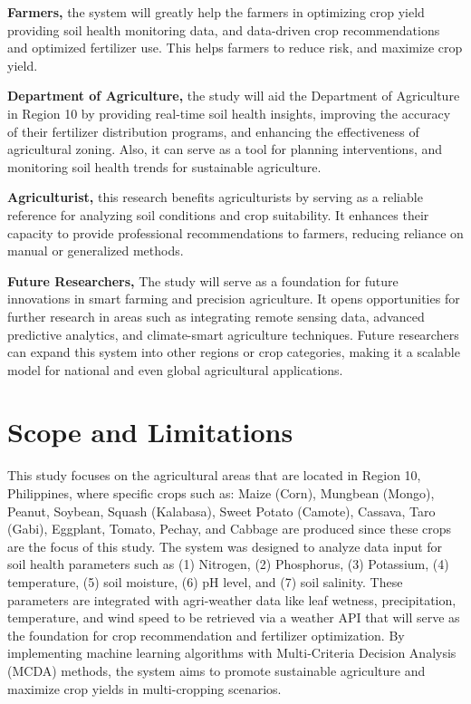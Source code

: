 \begin{doublespace}
\textbf{Farmers,} the system will greatly help the farmers in optimizing crop yield providing soil health monitoring data, and data-driven crop recommendations and optimized fertilizer use. This helps farmers to reduce risk, and maximize crop yield. 

\textbf{Department of Agriculture,} the study will aid the Department of Agriculture in Region 10 by providing real-time soil health insights, improving the accuracy of their fertilizer distribution programs, and enhancing the effectiveness of agricultural zoning. Also, it can serve as a tool for planning interventions, and monitoring soil health trends for sustainable agriculture.

\textbf{Agriculturist,} this research benefits agriculturists by serving as a reliable reference for analyzing soil conditions and crop suitability. It enhances their capacity to provide professional recommendations to farmers, reducing reliance on manual or generalized methods.

\textbf{Future Researchers,} The study will serve as a foundation for future innovations in smart farming and precision agriculture. It opens opportunities for further research in areas such as integrating remote sensing data, advanced predictive analytics, and climate-smart agriculture techniques. Future researchers can expand this system into other regions or crop categories, making it a scalable model for national and even global agricultural applications.

\section{Scope and Limitations}

This study focuses on the agricultural areas that are located in Region 10, Philippines, where specific crops such as: Maize (Corn), Mungbean (Mongo), Peanut, Soybean, Squash (Kalabasa), Sweet Potato (Camote), Cassava, Taro (Gabi), Eggplant, Tomato, Pechay, and Cabbage are produced since these crops are the focus of this study. The system was designed to analyze data input for soil health parameters such as (1) Nitrogen, (2) Phosphorus, (3) Potassium, (4) temperature,  (5) soil moisture, (6) pH level, and (7) soil salinity. These parameters are integrated with agri-weather data like leaf wetness, precipitation, temperature, and wind speed to be retrieved via a weather API that will serve as the foundation for crop recommendation and fertilizer optimization. By implementing machine learning algorithms with Multi-Criteria Decision Analysis (MCDA) methods, the system aims to promote sustainable agriculture and maximize crop yields in multi-cropping scenarios.


\end{doublespace}
